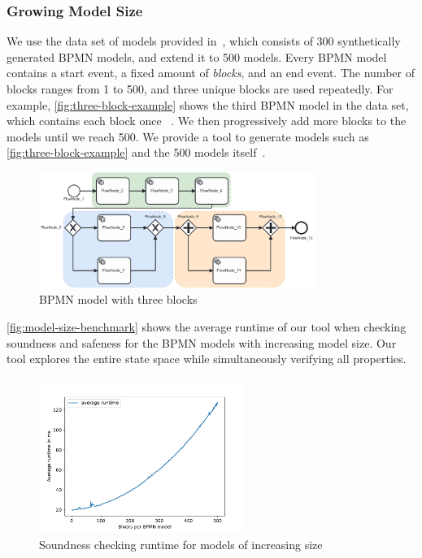 \documentclass[runningheads]{llncs}
\begin{document}
\subsubsection{Growing Model Size}
We use the data set of models provided in~\cite{krauterHigherorderTransformationApproach2023}, which consists of 300 synthetically generated BPMN models, and extend it to 500 models.
Every BPMN model contains a start event, a fixed amount of \textit{blocks}, and an end event.
The number of blocks ranges from 1 to 500, and three unique blocks are used repeatedly.
For example, \autoref{fig:three-block-example} shows the third BPMN model in the data set, which contains each block once ~\cite{krauterHigherorderTransformationApproach2023}.
We then progressively add more blocks to the models until we reach 500.
We provide a tool to generate models such as \autoref{fig:three-block-example} and the 500 models itself~\cite{noauthorgivenBPM2024Artifacts2024}.

\begin{figure}[ht]
	\centering
	\includegraphics[width=0.8\textwidth]{images/three-blocks}
	\caption{BPMN model with three blocks~\cite{krauterHigherorderTransformationApproach2023}}
	\label{fig:three-block-example}
\end{figure}

\autoref{fig:model-size-benchmark} shows the average runtime of our tool when checking soundness and safeness for the BPMN models with increasing model size.
Our tool explores the entire state space while simultaneously verifying all properties.

\begin{figure}[ht]
	\centering
	\includegraphics[width=0.6\textwidth]{images/model-size-benchmark}
	\caption{Soundness checking runtime for models of increasing size}
	\label{fig:model-size-benchmark}
\end{figure}
\end{document}
